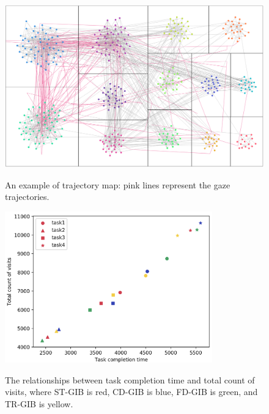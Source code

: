 \documentclass{llncs}
\begin{document}
\begin{figure}[h]
  \def\@captype{table}
  \begin{minipage}[c]{.48\textwidth}
  	\begin{center}
    \includegraphics[width=1.0\textwidth]{4-3.png}
    \caption{An example of trajectory map: pink lines represent the gaze trajectories.}
    \end{center}
    \label{traje}
  \end{minipage}
  \hfill
  \begin{minipage}[c]{.48\textwidth}
  \begin{center}
      \includegraphics[width=0.8\textwidth]{time-count.png}
        \caption{The relationships between task completion time and total count of visits, where ST-GIB is red, CD-GIB is blue, FD-GIB is green, and TR-GIB is yellow.}
    \end{center}
    \label{time-CV}
  \end{minipage}
\end{figure}
\end{document}
